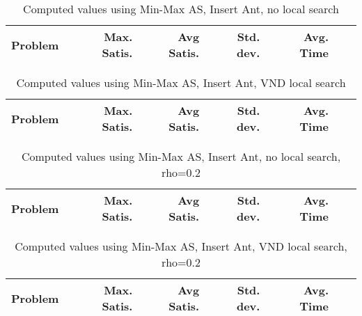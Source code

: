 \documentclass{article}
\begin{document}
\clearpage

\begin{table}
  \caption{Computed values using Min-Max AS, Insert Ant, no local search}
  \label{tab:conf12}
  \setlength{\tabcolsep}{1.4mm}
  \centering
  \begin{tabular}{lrrrrrr}
    \bfseries Problem &
    \bfseries Max. Satis. &
    \bfseries Avg Satis. &
    \bfseries Std. dev. &
    \bfseries Avg. Time 
    \\\hline
    
    \hline
  \end{tabular}

\end{table}


\begin{table}
  \caption{Computed values using Min-Max AS, Insert Ant, VND local search}
  \label{tab:conf13}
  \setlength{\tabcolsep}{1.4mm}
  \centering
  \begin{tabular}{lrrrrrr}
    \bfseries Problem &
    \bfseries Max. Satis. &
    \bfseries Avg Satis. &
    \bfseries Std. dev. &
    \bfseries Avg. Time 
    \\\hline
    
    \hline
  \end{tabular}

\end{table}


\begin{table}
  \caption{Computed values using Min-Max AS, Insert Ant, no local search, rho=0.2}
  \label{tab:conf14}
  \setlength{\tabcolsep}{1.4mm}
  \centering
  \begin{tabular}{lrrrrrr}
    \bfseries Problem &
    \bfseries Max. Satis. &
    \bfseries Avg Satis. &
    \bfseries Std. dev. &
    \bfseries Avg. Time 
    \\\hline
    
    \hline
  \end{tabular}

\end{table}

\begin{table}
  \caption{Computed values using Min-Max AS, Insert Ant, VND local search, rho=0.2}
  \label{tab:conf15}
  \setlength{\tabcolsep}{1.4mm}
  \centering
  \begin{tabular}{lrrrrrr}
    \bfseries Problem & 
    \bfseries Max. Satis. &
    \bfseries Avg Satis. &
    \bfseries Std. dev. &
    \bfseries Avg. Time 
    \\\hline
    
    \hline
  \end{tabular}

\end{table}
\end{document}
